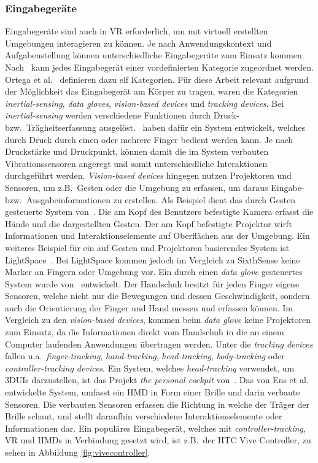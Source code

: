 \subsubsection{Eingabegeräte}
Eingabegeräte sind auch in VR erforderlich, um mit virtuell erstellten Umgebungen interagieren zu können. Je nach Anwendungskontext und Aufgabenstellung können unterschiedliche Eingabegeräte zum Einsatz kommen. 
Nach~\cite{modernworldinputdevices} kann jedes Eingabegerät einer vordefinierten Kategorie zugeordnet werden. Ortega et al.~ definieren dazu elf Kategorien. Für diese Arbeit relevant aufgrund der Möglichkeit das Eingabegerät am Körper zu tragen, waren die Kategorien \textit{inertial-sensing}, \textit{data gloves}, \textit{vision-based devices} und \textit{tracking devices}. Bei
\textit{inertial-sensing} werden verschiedene Funktionen durch Druck- bzw.~Trägheitserfassung ausgelöst.~\cite{skinput} haben dafür ein System entwickelt, welches durch Druck durch einen oder mehrere Finger bedient werden kann. Je nach Druckstärke und Druckpunkt, können damit die im System verbauten Vibrationssensoren angeregt und somit unterschiedliche Interaktionen durchgeführt werden. \textit{Vision-based devices} hingegen nutzen Projektoren und Sensoren, um z.B.~Gesten oder die Umgebung zu erfassen, um daraus Eingabe- bzw.~Ausgabeinformationen zu erstellen. Als Beispiel dient das durch Gesten gesteuerte System von~\cite{sixthsense}. Die am Kopf des Benutzers befestigte Kamera erfasst die Hände und die dargestellten Gesten. Der am Kopf befestigte Projektor wirft Informationen und Interaktionselemente auf Oberflächen aus der Umgebung. Ein weiteres Beispiel für ein auf Gesten und Projektoren basierendes System ist LightSpace~\cite{lightspace}. Bei LightSpace kommen jedoch im Vergleich zu SixthSense keine Marker an Fingern oder Umgebung vor. Ein durch einen \textit{data glove} gesteuertes System wurde von~\cite{dataglove} entwickelt. Der Handschuh besitzt für jeden Finger eigene Sensoren, welche nicht nur die Bewegungen und dessen Geschwindigkeit, sondern auch die Orientierung der Finger und Hand messen und erfassen können. Im Vergleich zu den \textit{vision-based devices}, kommen beim \textit{data glove} keine Projektoren zum Einsatz, da die Informationen direkt vom Handschuh in die an einem Computer laufenden Anwendungen übertragen werden. Unter die \textit{tracking devices} fallen u.a.~\textit{finger-tracking}, \textit{hand-tracking}, \textit{head-tracking}, \textit{body-tracking} oder \textit{controller-tracking devices}. Ein System, welches \textit{head-tracking} verwendet, um 3DUIs darzustellen, ist das Projekt \textit{the personal cockpit} von~\cite{thepersonalcockpit}. Das von Ens et al. entwickelte System, umfasst ein HMD in Form einer Brille und darin verbaute Sensoren. Die verbauten Sensoren erfassen die Richtung in welche der Träger der Brille schaut, und stellt daraufhin verschiedene Interaktionselemente oder Informationen dar. Ein populäres Eingabegerät, welches mit \textit{controller-tracking}, VR und HMDs in Verbindung gesetzt wird, ist z.B.~der HTC Vive Controller, zu sehen in Abbildung \ref{fig:vivecontroller}.


